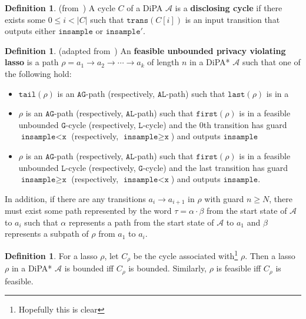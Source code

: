 \documentclass[12pt]{article}
\newcommand{\gguard}{\texttt{insample}\geq \texttt{x}}
\newcommand{\lguard}{\texttt{insample} < \texttt{x}}
\theoremstyle{definition}
\newtheorem{defn}[thm]{Definition}
\begin{document}
\begin{defn} (from~\cite{chadhaLinearTimeDecidability2021}) A cycle $C$ of a DiPA $\mathcal{A}$ is a \textbf{disclosing cycle} if there exists some $0\leq i <|C|$ such that $\texttt{trans}(C[i])$ is an input transition that outputs either $\texttt{insample}$ or $\texttt{insample}'$.
\end{defn}


\begin{defn} (adapted from~\cite{chadhaLinearTimeDecidability2021})
	An \textbf{feasible unbounded privacy violating lasso} is a path $\rho = a_1\to a_2\to \cdots\to a_k$ of length $n$ in a DiPA* $\mathcal{A}$ such that one of the following hold:

	\begin{itemize}
		\item $\texttt{tail}(\rho)$ is an $\texttt{AG}$-path (respectively, $\texttt{AL}$-path) such that $\texttt{last}(\rho)$ is in a
		\item $\rho$ is an $\texttt{AG}$-path (respectively, $\texttt{AL}$-path) such that $\texttt{first}(\rho)$ is in a feasible unbounded $\texttt{G}$-cycle (respectively, $\texttt{L}$-cycle) and the 0th transition has guard $\lguard$ (respectively, $\gguard$) and outputs $\texttt{insample}$ 
		\item $\rho$ is an $\texttt{AG}$-path (respectively, $\texttt{AL}$-path) such that $\texttt{first}(\rho)$ is in a feasible unbounded $\texttt{L}$-cycle (respectively, $\texttt{G}$-cycle) and the last transition has guard $\gguard$ (respectively, $\lguard$) and outputs $\texttt{insample}$.
	\end{itemize}

	In addition, if there are any transitions $a_i\to a_{i+1}$ in $\rho$ with guard $n\geq N$, there must exist some path represented by the word $\tau = \alpha \cdot \beta$ from the start state of $\mathcal{A}$ to $a_i$ such that $\alpha$ represents a path from the start state of $\mathcal{A}$ to $a_1$ and $\beta$ represents a subpath of $\rho$ from $a_1$ to $a_i$.

\end{defn}

\begin{defn}
For a lasso $\rho$, let $C_\rho$ be the cycle associated with\footnote{Hopefully this is clear} $\rho$. Then a lasso $\rho$ in a DiPA* $\mathcal{A}$ is bounded iff $C_\rho$ is bounded. Similarly, $\rho$ is feasible iff $C_\rho$ is feasible.
\end{defn}
\end{document}
